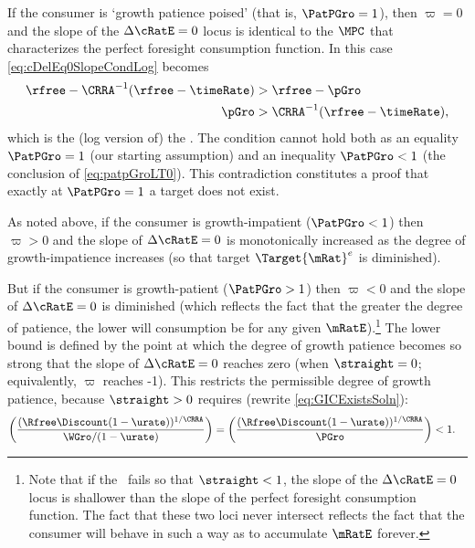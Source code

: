 \documentclass{handout}
\begin{document}
If the consumer is `growth patience poised' (that is, $\PatPGro = 1$), then $\varpi = 0$ and the slope of the $\dcEqZero$ locus is identical to the $\MPCU$ that characterizes the perfect foresight consumption function.  In this case \eqref{eq:cDelEq0SlopeCondLog} becomes
\begin{equation}\begin{gathered}\begin{aligned}
  \rfree-\CRRA^{-1}(\rfree-\timeRate) & >   \rfree-\pGro
\\ \pGro & >  \CRRA^{-1}(\rfree-\timeRate) \label{eq:patpGroLT0}
,\end{aligned}\end{gathered}\end{equation}
which is the (log version of) the \GICPGro.  The condition cannot hold both as an equality $\PatPGro=1$ (our starting assumption) and an inequality $\PatPGro < 1$ (the conclusion of \eqref{eq:patpGroLT0}).  This contradiction constitutes a proof that exactly at $\PatPGro=1$ a target does not exist.


As noted above, if the consumer is growth-impatient ($\PatPGro < 1$) then $\varpi > 0$ and the slope of $\dcEqZero$ is monotonically increased as the degree of growth-impatience increases (so that target $\Target{\mRat}^{e}$ is diminished).  

But if the consumer is growth-patient ($\PatPGro > 1$) then $\varpi < 0$ and the slope of $\dcEqZero$ is diminished (which reflects the fact that the greater the degree of patience, the lower will consumption be for any given $\mRatE$).\footnote{Note that if the \GICPGro~fails so that $\straight < 1$, the slope of the $\dcEqZero$ locus is shallower than the slope of the perfect foresight consumption function.  The fact that these two loci never intersect reflects the fact that the consumer will behave in such a way as to accumulate $\mRatE$ forever.}  The lower bound is defined by the point at which the degree of growth patience becomes so strong that the slope of $\dcEqZero$ reaches zero (when $\straight=0$; equivalently, $\varpi$ reaches -1).  This restricts the permissible degree of growth patience, because $\straight > 0$ requires (rewrite \eqref{eq:GICExistsSoln}):
\begin{equation}\begin{gathered}\begin{aligned}
  \left(\frac{(\Rfree \Discount (1-\urate))^{1/\CRRA}}{\WGro/(1-\urate)}\right) = \left(\frac{(\Rfree \Discount (1-\urate))^{1/\CRRA}}{\PGro}\right) & <  1
.\end{aligned}\end{gathered}\end{equation}
\end{document}
